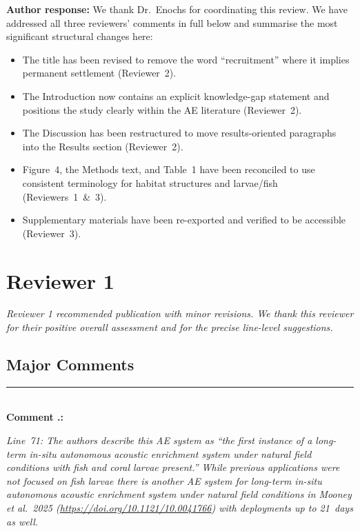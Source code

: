 \documentclass[12pt]{article}
\newcommand{\authornote}[1]{%
  \par\noindent\textcolor{notecolor}{\textbf{Author response:} #1}\par}
\newenvironment{reviewercomment}{%
  \par\noindent\textcolor{revcolor}\bgroup\itshape}{\egroup\par}
\newcounter{rcounter}[section]
\newcommand{\RC}[1]{%
  \stepcounter{rcounter}%
  \bigskip
  \noindent\rule{\linewidth}{0.4pt}\\[2pt]
  \textbf{Comment \arabic{section}.\arabic{rcounter}:}\\[4pt]
  \begin{reviewercomment}#1\end{reviewercomment}}
\newcommand{\AR}[1]{%
  \authornote{#1}}
\begin{document}
\AR{We thank Dr.\ Enochs for coordinating this review. We have addressed all
three reviewers' comments in full below and summarise the most significant
structural changes here:
\begin{itemize}[noitemsep]
  \item The title has been revised to remove the word ``recruitment'' where it
    implies permanent settlement (Reviewer~2).
  \item The Introduction now contains an explicit knowledge-gap statement and
    positions the study clearly within the AE literature (Reviewer~2).
  \item The Discussion has been restructured to move results-oriented
    paragraphs into the Results section (Reviewer~2).
  \item Figure~4, the Methods text, and Table~1 have been reconciled to use
    consistent terminology for habitat structures and larvae/fish
    (Reviewers~1~\&~3).
  \item Supplementary materials have been re-exported and verified to be
    accessible (Reviewer~3).
\end{itemize}}

\newpage

\section{Reviewer 1}

\noindent\textit{Reviewer 1 recommended publication with minor revisions.
We thank this reviewer for their positive overall assessment and for the
precise line-level suggestions.}

\subsection*{Major Comments}

\RC{Line~71: The authors describe this AE system as ``the first instance of a
long-term in-situ autonomous acoustic enrichment system under natural field
conditions with fish and coral larvae present.'' While previous applications
were not focused on fish larvae there is another AE system for long-term
in-situ autonomous acoustic enrichment system under natural field conditions
in Mooney et al.\ 2025 (\url{https://doi.org/10.1121/10.0041766}) with
deployments up to 21~days as well.}
\end{document}
